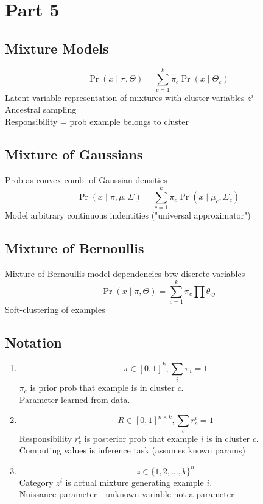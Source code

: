 \section{Part 5}
\subsection*{Mixture Models}
\[\Pr(x\mid \pi, \Theta)=\sum_{c=1}^k \pi_c \Pr(x\mid \Theta_c)\]
Latent-variable representation of mixtures with cluster variables $z^i$\\
Ancestral sampling \\
Responsibility = prob example belongs to cluster\\
\subsection*{Mixture of Gaussians}
Prob as convex comb. of Gaussian densities\\
\[\Pr(x\mid \pi, \mu,\Sigma)=\sum_{c=1}^k \pi_c \Pr(x\mid \mu_c,\Sigma_c)\]
Model arbitrary continuous indentities ("universal approximator")\\
\subsection*{Mixture of Bernoullis}
Mixture of Bernoullis model dependencies btw discrete variables\\
\[\Pr(x\mid \pi, \Theta)=\sum_{c=1}^k \pi_c \prod\theta_{cj}\]
Soft-clustering of examples
\subsection*{Notation}
\begin{enumerate}
    \item \[\pi\in{[0,1]}^k, \sum_i\pi_i=1\]
    $\pi_c$ is prior prob that example is in cluster $c$. \\
    Parameter learned from data.
    \item \[R\in{[0,1]}^{n\times k},\sum_c r_c^i=1\]
    Responsibility $r_c^i$ is posterior prob that example $i$ is in cluster $c$.\\
    Computing values is inference task (assumes known params)
    \item \[z\in\{1,2,\dots,k\}^n\]
    Category $z^i$ is actual mixture generating example $i$.\\
    Nuissance parameter - unknown variable not a parameter
\end{enumerate}
